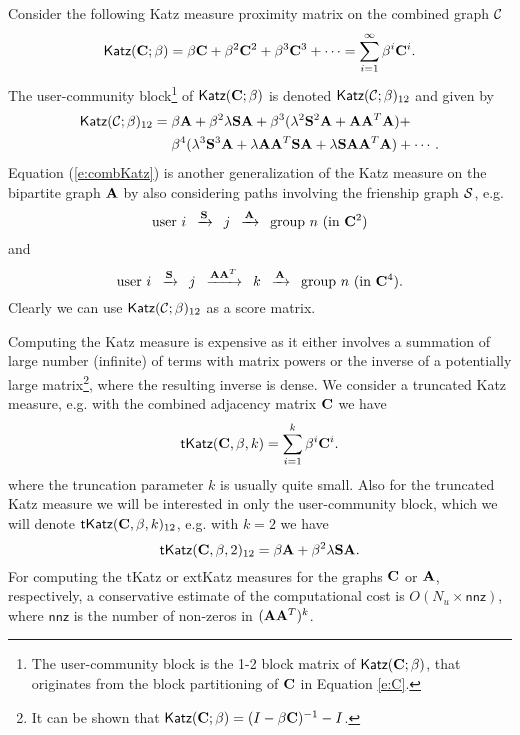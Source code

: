 Consider the following \textsf{Katz} measure proximity matrix on the combined graph $\mathcal{C}$
\[
\textsf{Katz}(\mathbf{C}; \beta) = \beta \mathbf{C} + \beta^2 \mathbf{C}^2 + \beta^3 \mathbf{C}^3 + \cdots = \sum_{i = 1}^\infty \beta^i \mathbf{C}^i.
\]
The user-community block\footnote{The user-community block is the 1-2 block matrix of $\textsf{Katz}(\mathbf{C};\beta)$, that originates from the block partitioning of $\mathbf{C}$ in Equation \eqref{e:C}.} of $\textsf{Katz}(\mathbf{C}; \beta)$ is denoted 
$\textsf{Katz}(\mathcal{C}; \beta)_{12}$ and given by 
\begin{align}
\textsf{Katz}(\mathcal{C}; \beta)_{12}  & = \beta \mathbf{A} + \beta^2 \lambda \mathbf{S} \mathbf{A} +  \beta^3(\lambda^2 \mathbf{S}^2 \mathbf{A} + \mathbf{A} \mathbf{A}^T \mathbf{A}) + \notag \\
 & \mathrel{\phantom{=}} \beta^4(\lambda^3 \mathbf{S}^3 \mathbf{A} + \lambda \mathbf{A} \mathbf{A}^T \mathbf{S} \mathbf{A}+ \lambda \mathbf{S} \mathbf{A} \mathbf{A}^T \mathbf{A}) + \cdots.
\label{e:combKatz}
\end{align}
Equation (\ref{e:combKatz}) is another generalization of the \textsf{Katz} measure on the bipartite graph $\mathbf{A}$
by also considering paths involving the frienship graph $\mathcal{S}$, e.g. 
\[
\text{user $i$ } \, \xrightarrow{\mathbf{S}}\, \text{ $j$ } \,\xrightarrow{\mathbf{A}} \, \text{ group $n$ (in $\mathbf{C}^2$)}
\]
and
\[
\text{user $i$ } \, \xrightarrow{\mathbf{S}} \, \text{ $j$ } \, \xrightarrow{\mathbf{A}\mathbf{A}^T} \, \text{ $k$ }\, \xrightarrow{\mathbf{A}}\, \text{ group $n$ (in $\mathbf{C}^4$)}.
\]
Clearly we can use $\textsf{Katz}(\mathcal{C}; \beta)_{12}$ as a score matrix.

Computing the \textsf{Katz} measure is expensive as it either involves a summation of large number (infinite) of terms with matrix powers or the inverse of a potentially large matrix\footnote{It can be shown that $\textsf{Katz}(\mathbf{C};\beta) = ( I - \beta \mathbf{C})^{-1} - I$.}, where the resulting inverse is dense. We consider a truncated \textsf{Katz} measure, e.g. with the combined adjacency matrix $\mathbf{C}$ we have  
\begin{equation}
\textsf{tKatz}(\mathbf{C}, \beta, k) = \sum_{i=1}^{k} \beta^i \mathbf{C}^i.
\label{e:tKatzC}
\end{equation}
where the truncation parameter $k$ is usually quite small. Also for the truncated \textsf{Katz} measure we will be interested in only the user-community block, which we will denote $\textsf{tKatz}(\mathbf{C}, \beta, k)_{12}$, e.g. with $k = 2$ we have
\begin{equation}
\textsf{tKatz}(\mathbf{C}, \beta, 2)_{12} = \beta \mathbf{A} + \beta^2 \lambda \mathbf{S} \mathbf{A}.
\label{e:tkatz12}
\end{equation}
For computing the \textsf{tKatz} or \textsf{extKatz} measures for the graphs $\mathbf{C}$ or $\mathbf{A}$, respectively, a conservative estimate of the computational cost is $O(N_u \times \textsf{nnz})$, where $\textsf{nnz}$ is the number of non-zeros in $(\mathbf{A}\mathbf{A}^T)^k$.

